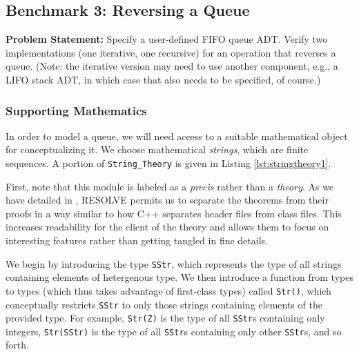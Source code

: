 	\subsection{Benchmark 3: Reversing a Queue}	

\textbf{Problem Statement:} Specify a user-defined FIFO queue ADT. Verify two implementations (one iterative, one recursive) for an operation that reverses a queue. (Note: the iterative version may need to use another component, e.g., a LIFO stack ADT, in which case that also needs to be specified, of course.)

		\subsubsection{Supporting Mathematics}	

In order to model a queue, we will need access to a suitable mathematical object for conceptualizing it.  We choose mathematical \emph{strings}, which are finite sequences.  A portion of \texttt{String\_Theory} is given in Listing \ref{lst:stringtheory1}.



First, note that this module is labeled as a \emph{prec\`{i}s} rather than a \emph{theory}.  As we have detailed in \cite{smith08}, RESOLVE permits us to separate the theorems from their proofs in a way similar to how C++ separates header files from class files.  This increases readability for the client of the theory and allows them to focus on interesting features rather than getting tangled in fine details.

We begin by introducing the type \texttt{SStr}, which represents the type of all strings containing elements of hetergenous type.  We then introduce a function from types to types (which thus takes advantage of first-class types) called \texttt{Str()}, which conceptually restricts \texttt{SStr} to only those strings containing elements of the provided type.  For example, \texttt{Str(Z)} is the type of all \texttt{SStr}s containing only integers, \texttt{Str(SStr)} is the type of all \texttt{SStr}s containing only other \texttt{SStr}s, and so forth.

